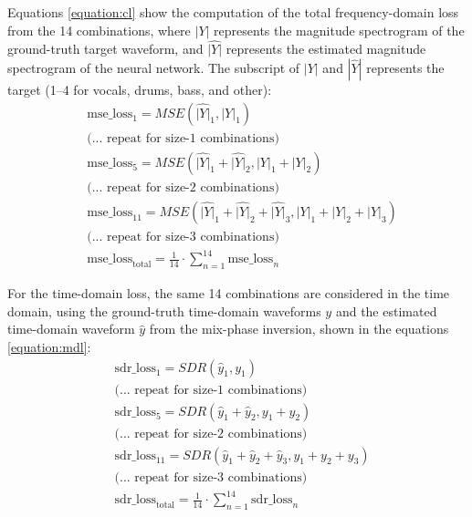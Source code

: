 \documentclass[report.tex]{subfiles}
\begin{document}
Equations \eqref{equation:cl} show the computation of the total frequency-domain loss from the 14 combinations, where $|Y|$ represents the magnitude spectrogram of the ground-truth target waveform, and $\hat{|Y|}$ represents the estimated magnitude spectrogram of the neural network. The subscript of $|Y|$ and $|\hat{Y}|$ represents the target (1--4 for vocals, drums, bass, and other):
\begin{align}\tag{31}\label{equation:cl}
	\nonumber & \text{mse\_loss}_{1} = \mathit{MSE}(\hat{|Y|}_{1}, |Y|_{1})\\
	\nonumber & \text{(... repeat for size-1 combinations)}\\
	\nonumber & \text{mse\_loss}_{5} = \mathit{MSE}(\hat{|Y|}_{1} + \hat{|Y|}_{2}, |Y|_{1} + |Y|_{2})\\
	\nonumber & \text{(... repeat for size-2 combinations)}\\
	\nonumber & \text{mse\_loss}_{11} = \mathit{MSE}(\hat{|Y|}_{1} + \hat{|Y|}_{2} + \hat{|Y|}_{3}, |Y|_{1} + |Y|_{2} + |Y|_{3})\\
	\nonumber & \text{(... repeat for size-3 combinations)}\\
	\nonumber & \text{mse\_loss}_{\text{total}} = \frac{1}{14} \cdot \sum_{n = 1}^{14}{\text{mse\_loss}_{n}}
\end{align}

For the time-domain loss, the same 14 combinations are considered in the time domain, using the ground-truth time-domain waveforms $y$ and the estimated time-domain waveform $\hat{y}$ from the mix-phase inversion, shown in the equations \eqref{equation:mdl}:
\begin{align}\tag{32}\label{equation:mdl}
	\nonumber & \text{sdr\_loss}_{1} = \mathit{SDR}(\hat{y}_{1}, y_{1})\\
	\nonumber & \text{(... repeat for size-1 combinations)}\\
	\nonumber & \text{sdr\_loss}_{5} = \mathit{SDR}(\hat{y}_{1} + \hat{y}_{2}, y_{1} + y_{2})\\
	\nonumber & \text{(... repeat for size-2 combinations)}\\
	\nonumber & \text{sdr\_loss}_{11} = \mathit{SDR}(\hat{y}_{1} + \hat{y}_{2} + \hat{y}_{3}, y_{1} + y_{2} + y_{3})\\
	\nonumber & \text{(... repeat for size-3 combinations)}\\
	\nonumber & \text{sdr\_loss}_{\text{total}} = \frac{1}{14} \cdot \sum_{n = 1}^{14}{\text{sdr\_loss}_{n}}
\end{align}
\end{document}
